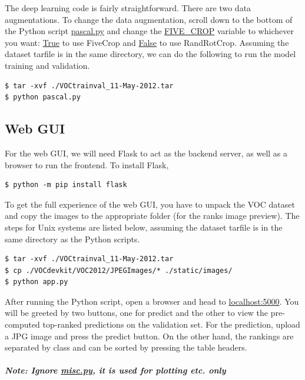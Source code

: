 \documentclass{article}
\begin{document}
The deep learning code is fairly straightforward. There are two data augmentations. To change the data augmentation, scroll down to the bottom of the Python script \url{pascal.py} and change the \url{FIVE_CROP} variable to whichever you want: \url{True} to use FiveCrop and \url{False} to use RandRotCrop. Assuming the dataset tarfile is in the same directory, we can do the following to run the model training and validation.
\begin{lstlisting}
$ tar -xvf ./VOCtrainval_11-May-2012.tar
$ python pascal.py
\end{lstlisting}

\subsection{Web GUI}
For the web GUI, we will need Flask to act as the backend server, as well as a browser to run the frontend. To install Flask,

\begin{lstlisting}
$ python -m pip install flask
\end{lstlisting}

To get the full experience of the web GUI, you have to unpack the VOC dataset and copy the images to the appropriate folder (for the ranks image preview). The steps for Unix systems are listed below, assuming the dataset tarfile is in the same directory as the Python scripts.
\begin{lstlisting}
$ tar -xvf ./VOCtrainval_11-May-2012.tar
$ cp ./VOCdevkit/VOC2012/JPEGImages/* ./static/images/
$ python app.py
\end{lstlisting}

After running the Python script, open a browser and head to \url{localhost:5000}. You will be greeted by two buttons, one for predict and the other to view the pre-computed top-ranked predictions on the validation set. For the prediction, upload a JPG image and press the predict button. On the other hand, the rankings are separated by class and can be sorted by pressing the table headers.

\paragraph{\textit{Note: Ignore \url{misc.py}, it is used for plotting etc. only}} 
\end{document}
